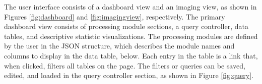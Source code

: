 The user interface consists of a dashboard view and an imaging view, as shown in Figures \ref{fig:dashboard} and \ref{fig:imagingview}, respectively. The primary dashboard view consists of processing module sections, a query controller, data tables, and descriptive statistic visualizations. The processing modules are defined by the user in the JSON structure, which describes the module names and columns to display in the data table, below. Each entry in the table is a link that, when clicked, filters all tables on the page. The filters or queries can be saved, edited, and loaded in the query controller section, as shown in Figure \ref{fig:query}. 